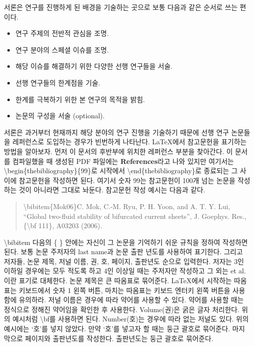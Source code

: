 \documentclass{gshs-report-v1.2}
\begin{document}
서론은 연구를 진행하게 된 배경을 기술하는 곳으로 보통 다음과 같은 순서로 쓰는 편이다.
\begin{itemize}
	\item{연구 주제의 전반적 관심을 조명.}
	\item{연구 분야의 스페셜 이슈를 조명.}
	\item{해당 이슈를 해결하기 위한 다양한 선행 연구들을 서술.}
	\item{선행 연구들의 한계점을 기술.}
	\item{한계를 극복하기 위한 본 연구의 목적을 밝힘.}
	\item{논문의 구성을 서술 (optional).}
\end{itemize}
서론은 과거부터 현재까지 해당 분야의 연구 진행을 기술하기 때문에 선행 연구 논문들을 레퍼런스로 도입하는 경우가 빈번하게 나타난다. \LaTeX 에서 참고문헌을 표기하는 방법을 알아보자. 먼저 이 문서의 후반부에 위치한 레퍼런스 부분을 찾아간다. 이 문서를 컴파일했을 때 생성된 PDF 파일에는 {\bf References}라고 나와 있지만 여기서는 {\textbackslash}begin\{thebibliography\}\{99\}로 시작에서 {\textbackslash}end\{thebibliography\}로 종료되는 그 사이에 참고문헌을 작성하면 된다. 여기서 숫자 99는 참고문헌이 100개 넘는 논문을 작성하는 것이 아니라면 그대로 놔둔다. 참고문헌 작성 예시는 다음과 같다.
\begin{quote}
	{\textbackslash}bibitem\{Mok06\}C. Mok, C.-M. Ryu, P. H. Yoon, and A. T. Y. Lui, ``Global two-fluid stability of bifurcated current sheets'', J. Goephys. Res., \{{\textbackslash}bf 111\}, A03203 (2006).
\end{quote}
{\textbackslash}bibitem 다음의 \{ \} 안에는 자신이 그 논문을 기억하기 쉬운 규칙을 정하여 작성하면 된다. 보통 논문 주저자의 last name과 논문 출판 년도를 사용하여 표기한다. 그리고 저자들, 논문 제목, 저널 이름, 권, 호, 페이지, 출판년도 순으로 입력한다. 저자는 3인 이하일 경우에는 모두 적도록 하고 4인 이상일 때는 주저자만 작성하고 그 외는 et al.이란 표기로 대체한다. 논문 제목은 큰 따옴표로 묶어준다. \LaTeX 에서 시작하는 따옴표는 키보드에서 숫자 1 왼쪽 버튼, 마치는 따옴표는 키보드 엔터키 왼쪽 버튼을 사용함에 유의하라. 저널 이름은 경우에 따라 약어를 사용할 수 있다. 약어를 사용할 때는 정식으로 정해진 약어임을 확인한 후 사용한다. Volume(권)은 굵은 글자 처리한다. 위의 예시처럼 {\textbackslash}bf를 사용하면 된다. Number(호)는 경우에 따라 없는 저널도 있다. 위의 예시에는 `호'를 넣지 않았다. 만약 `호'를 넣고자 할 때는 둥근 괄호로 묶어준다. 마지막으로 페이지와 출판년도를 작성한다. 출판년도는 둥근 괄호로 묶어준다.
\end{document}
